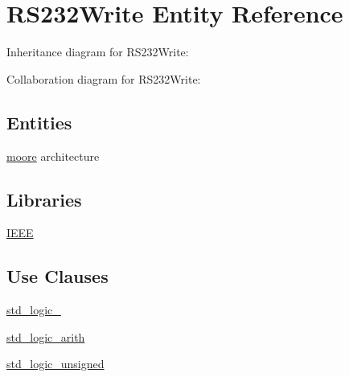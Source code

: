 \hypertarget{class_r_s232_write}{}\section{R\+S232\+Write Entity Reference}
\label{class_r_s232_write}


Inheritance diagram for R\+S232\+Write\+:


Collaboration diagram for R\+S232\+Write\+:
\subsection*{Entities}
\begin{DoxyCompactItemize}
\item 
\hyperlink{class_r_s232_write_1_1moore}{moore} architecture
\end{DoxyCompactItemize}
\subsection*{Libraries}
 \begin{DoxyCompactItemize}
\item 
\hyperlink{class_r_s232_write_ae4f03c286607f3181e16b9aa12d0c6d4}{I\+E\+E\+E} 
\end{DoxyCompactItemize}
\subsection*{Use Clauses}
 \begin{DoxyCompactItemize}
\item 
\hyperlink{class_r_s232_write_acd03516902501cd1c7296a98e22c6fcb}{std\+\_\+logic\+\_}   
\item 
\hyperlink{class_r_s232_write_a0f5ecc6613f63d07f7963a97b1b26095}{std\+\_\+logic\+\_\+arith}   
\item 
\hyperlink{class_r_s232_write_a598da929e807d58939b47499e8bc9fa8}{std\+\_\+logic\+\_\+unsigned}   
\end{DoxyCompactItemize}
